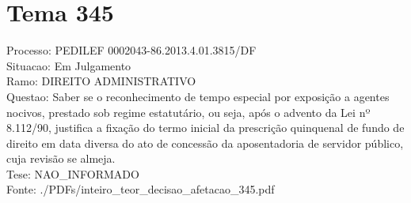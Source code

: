 \documentclass[12pt]{article}
\begin{document}
\section*{Tema 345}
Processo: PEDILEF 0002043-86.2013.4.01.3815/DF\\
Situacao: Em Julgamento\\
Ramo: DIREITO ADMINISTRATIVO\\
Questao: Saber se o reconhecimento de tempo especial por exposição a agentes nocivos, prestado sob regime estatutário, ou seja, após o advento da Lei nº 8.112/90, justifica a fixação do termo inicial da prescrição quinquenal de fundo de direito em data diversa do ato de concessão da aposentadoria de servidor público, cuja revisão se almeja.\\
Tese: NAO\_INFORMADO\\
Fonte: ./PDFs/inteiro\_teor\_decisao\_afetacao\_345.pdf
\end{document}
